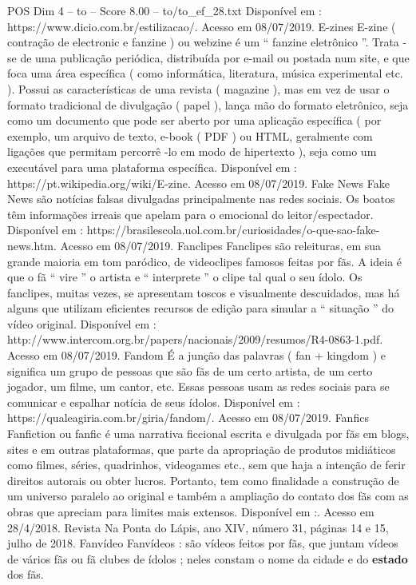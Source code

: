 \begin{textsample}{POS Dim 4 – to – Score 8.00 – to/to\_ef\_28.txt}
Disponível em : https://www.dicio.com.br/estilizacao/.
Acesso em 08/07/2019.
E-zines E-zine ( contração de electronic e fanzine ) ou webzine é um “ fanzine eletrônico ”.
Trata -se de uma publicação periódica, distribuída por e-mail ou postada num site, e que foca uma área específica ( como informática, literatura, música experimental etc. ).
Possui as características de uma revista ( magazine ), mas em vez de usar o formato tradicional de divulgação ( papel ), lança mão do formato eletrônico, seja como um documento que pode ser aberto por uma aplicação específica ( por exemplo, um arquivo de texto, e-book ( PDF ) ou HTML, geralmente com ligações que permitam percorrê -lo em modo de hipertexto ), seja como um executável para uma plataforma específica.
Disponível em : https://pt.wikipedia.org/wiki/E-zine.
Acesso em 08/07/2019.
Fake News Fake News são notícias falsas divulgadas principalmente nas redes sociais.
Os boatos têm informações irreais que apelam para o emocional do leitor/espectador.
Disponível em : https://brasilescola.uol.com.br/curiosidades/o-que-sao-fake-news.htm.
Acesso em 08/07/2019.
Fanclipes Fanclipes são releituras, em sua grande maioria em tom paródico, de videoclipes famosos feitas por fãs.
A ideia é que o fã “ vire ” o artista e “ interprete ” o clipe tal qual o seu ídolo.
Os fanclipes, muitas vezes, se apresentam toscos e visualmente descuidados, mas há alguns que utilizam eficientes recursos de edição para simular a “ situação ” do vídeo original.
Disponível em : http://www.intercom.org.br/papers/nacionais/2009/resumos/R4-0863-1.pdf.
Acesso em 08/07/2019.
Fandom É a junção das palavras ( fan + kingdom ) e significa um grupo de pessoas que são fãs de um certo artista, de um certo jogador, um filme, um cantor, etc.
Essas pessoas usam as redes sociais para se comunicar e espalhar notícia de seus ídolos.
Disponível em : https://qualeagiria.com.br/giria/fandom/.
Acesso em 08/07/2019.
Fanfics Fanfiction ou fanfic é uma narrativa ficcional escrita e divulgada por fãs em blogs, sites e em outras plataformas, que parte da apropriação de produtos midiáticos como filmes, séries, quadrinhos, videogames etc., sem que haja a intenção de ferir direitos autorais ou obter lucros.
Portanto, tem como finalidade a construção de um universo paralelo ao original e também a ampliação do contato dos fãs com as obras que apreciam para limites mais extensos.
Disponível em :.
Acesso em 28/4/2018.
Revista Na Ponta do Lápis, ano XIV, número 31, páginas 14 e 15, julho de 2018.
Fanvídeo Fanvídeos : são vídeos feitos por fãs, que juntam vídeos de vários fãs ou fã clubes de ídolos ; neles constam o nome da cidade e do \textbf{estado} dos fãs.

\end{textsample}
